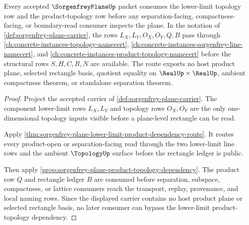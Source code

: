 \begin{theorem}
\label{thm:sorgenfrey-plane-lower-limit-product-topology-dependency}
Every accepted $\SorgenfreyPlaneUp$ packet consumes the lower-limit topology row and the product-topology row before any separation-facing, compactness-facing, or boundary-read consumer inspects the plane. In the notation of \autoref{def:sorgenfrey-plane-carrier}, the rows $L_X,L_Y,O_X,O_Y,Q,B$ pass through \autoref{ch:concrete-instances-topology-namecert}, \autoref{ch:concrete-instances-sorgenfrey-line-namecert}, and \autoref{ch:concrete-instances-product-topology-namecert} before the structural rows $S,H,C,R,N$ are available. The route exports no host product plane, selected rectangle basis, quotient equality on $\RealUp\times\RealUp$, ambient compactness theorem, or standalone separation theorem.
\end{theorem}
\begin{proof}
Project the accepted carrier of \autoref{def:sorgenfrey-plane-carrier}. The component lower-limit rows $L_X,L_Y$ and topology rows $O_X,O_Y$ are the only one-dimensional topology inputs visible before a plane-level rectangle can be read.

Apply \autoref{thm:sorgenfrey-plane-lower-limit-product-dependency-route}. It routes every product-open or separation-facing read through the two lower-limit line rows and the ambient $\TopologyUp$ surface before the rectangle ledger is public.

Then apply \autoref{prop:sorgenfrey-plane-product-topology-dependency}. The product row $Q$ and rectangle ledger $B$ are consumed before separation, subspace, compactness, or lattice consumers reach the transport, replay, provenance, and local naming rows. Since the displayed carrier contains no host product plane or selected rectangle basis, no later consumer can bypass the lower-limit product-topology dependency.
\end{proof}
